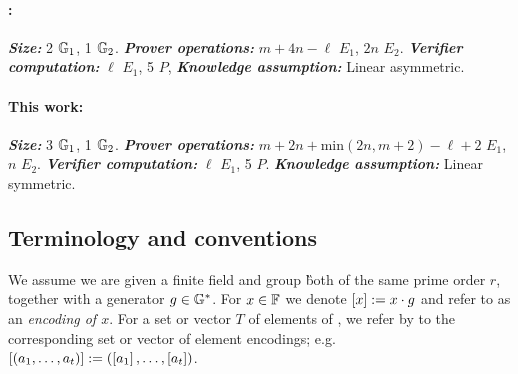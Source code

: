 \documentclass[11pt]{article}
\numberwithin{figure}{section} %
\begin{document}
 \paragraph{\cite{GM17}:} \textbf{\textit{Size:}} 2 ${\mathbb G}_1$, 1 ${\mathbb G}_2$.  \textbf{\textit{Prover operations:}} 
 $m+4n-\ell$ $E_1$, $2n$ $E_2$. \textbf{\textit{Verifier computation:}} $\ell$ $E_1$, 5 $P$, \textbf{\textit{Knowledge assumption:}} Linear asymmetric.
 \paragraph{This work:} \textbf{\textit{Size:}} 3 ${\mathbb G}_1$, 1 ${\mathbb G}_2$.  \textbf{\textit {Prover operations:}} 
 $m+2n+\mathrm{min}(2n,m+2)-\ell+2$ $E_1$, $n$ $E_2$. \textbf{\textit{Verifier computation:}} $\ell$ $E_1$, 5 $P$. \textit{\textbf{Knowledge assumption:}} Linear symmetric.
 




\subsection{Terminology and conventions}\label{subsec:terminology}
We assume we are given a finite field \F and group \G both of the same prime order $r$,
together with a generator $g\in{\mathbb G}^*$.
For $x\in\mathbb F$ we denote $\left[x\right]:= x\cdot g$ and refer to  as an \emph{encoding of $x$}.
For a set or vector $T$ of elements of \F, we refer by  to the corresponding set or vector of element encodings;
e.g. $\left[(a_1,\ldots,a_t)\right]:= (\left[a_1\right],\ldots,\left[a_t\right])$. 
\end{document}

